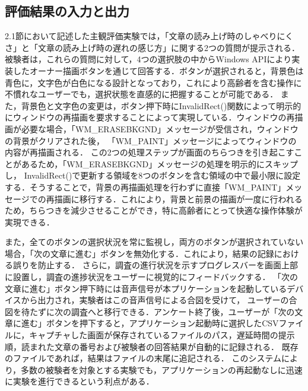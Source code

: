 \subsection{評価結果の入力と出力}
2.1節において記述した主観評価実験では，「文章の読み上げ時のしゃべりにくさ」と「文章の読み上げ時の遅れの感じ方」に関する2つの質問が提示される．
被験者は，これらの質問に対して，4つの選択肢の中からWindows APIにより実装したオーナー描画ボタン\cite{Win32API-reference}を通じて回答する．ボタンが選択されると，背景色は青色に，文字色が白色になる設計となっており，これにより高齢者を含む操作に不慣れなユーザーでも，選択状態を直感的に把握することが可能である．
また，背景色と文字色の変更は，ボタン押下時にInvalidRect()関数によって明示的にウィンドウの再描画を要求することによって実現している．ウィンドウの再描画が必要な場合，「WM\_ERASEBKGND」メッセージが受信され，ウィンドウの背景がクリアされた後，
「WM\_PAINT」メッセージによってウィンドウの内容が再描画される．
この2つの処理ステップが画面のちらつきを引き起こすことがあるため，「WM\_ERASEBKGND」メッセージの処理を明示的にスキップし，
InvalidRect()で更新する領域を8つのボタンを含む領域の中で最小限に設定する．そうすることで，背景の再描画処理を行わずに直接「WM\_PAINT」メッセージでの再描画に移行する．これにより，背景と前景の描画が一度に行われるため，ちらつきを減少させることができ，特に高齢者にとって快適な操作体験が実現できる．

また，全てのボタンの選択状況を常に監視し，両方のボタンが選択されていない場合，「次の文章に進む」ボタンを無効化する．これにより，結果の記録における誤りを防止する．
さらに，調査の進行状況を示すプログレスバーを画面上部に設置し，調査の進捗状況をユーザーに視覚的にフィードバックする．
「次の文章に進む」ボタン押下時には音声信号が本プリケーションを起動しているデバイスから出力され，実験者はこの音声信号による合図を受けて，
ユーザーの合図を待たずに次の調査へと移行できる．アンケート終了後，ユーザーが「次の文章に進む」ボタンを押下すると，アプリケーション起動時に選択したCSVファイルに，キャプチャした画面が保存されているファイルのパス，遅延時間の提示順，読まれた文章の番号および被験者の回答結果が自動的に記録される．
既存のファイルであれば，結果はファイルの末尾に追記される．
このシステムにより，多数の被験者を対象とする実験でも，アプリケーションの再起動なしに迅速に実験を進行できるという利点がある．
